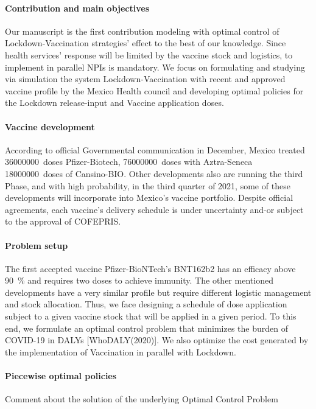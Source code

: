 \paragraph{Contribution and main objectives}
        Our manuscript is the first contribution modeling with optimal control
    of Lockdown-Vaccination strategies' effect to the best of our knowledge.
    Since health services' response will be limited by the vaccine stock
    and logistics, to implement in parallel NPIs is mandatory. We focus on
    formulating and studying via simulation the system Lockdown-Vaccination
    with recent and approved vaccine profile by the  Mexico Health council and
    developing optimal policies for the Lockdown release-input and Vaccine
    application doses.
\paragraph{Vaccine development}
        According to official Governmental communication in December, Mexico
    treated  \SI{36000000}{doses} Pfizer-Biotech, \SI{76000000}{doses} with
    Aztra-Seneca \SI{18000000}{doses} of Cansino-BIO. Other developments
    also are running the  third Phase, and with high probability,  in the
    third quarter of 2021, some of these developments will incorporate into
    Mexico's vaccine portfolio. Despite official agreements, each vaccine's
    delivery schedule is under uncertainty and-or subject to the approval
    of COFEPRIS.

\paragraph{Problem setup}
        The first accepted vaccine \textemdash Pfizer-BioNTech's BNT162b2
    \textemdash has an efficacy above \SI{90}{\percent}  and requires
    two doses to achieve immunity. The other mentioned developments have a very
    similar profile but require different logistic management and stock
    allocation.  Thus, we face designing a schedule of dose application subject
    to a given vaccine stock that will be applied in a given period. To this
    end, we formulate an optimal control problem that minimizes the burden of
    COVID-19 in DALYs [WhoDALY(2020)]. We also optimize the cost generated by
    the implementation of Vaccination in parallel with Lockdown.

\paragraph{Piecewise optimal policies}
    Comment about the solution of the underlying Optimal Control Problem

